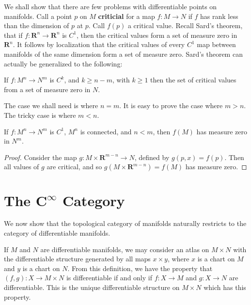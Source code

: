 We shall show that there are few problems with differentiable points on manifolds. Call a point $p$ on $M$ {\bf criticial} for a map $f:M \to N$ if $f$ has rank less than the dimension of $p$ at $p$. Call $f(p)$ a critical value. Recall Sard's theorem, that if $f: \mathbf{R}^n \to \mathbf{R}^n$ is $C^1$, then the critical values form a set of measure zero in $\mathbf{R}^n$. It follows by localization that the critical values of every $C^1$ map between manifolds of the same dimension form a set of measure zero. Sard's theorem can actually be generalized to the following:

\begin{theorem}[Sard]
    If $f:M^n \to N^m$ is $C^k$, and $k \geq n-m$, with $k \geq 1$ then the set of critical values from a set of measure zero in $N$.
\end{theorem}

The case we shall need is where $n = m$. It is easy to prove the case where $m > n$. The tricky case is where $m < n$.

\begin{theorem}
    If $f:M^n \to N^m$ is $C^1$, $M^n$ is connected, and $n < m$, then $f(M)$ has measure zero in $N^m$.
\end{theorem}
\begin{proof}
    Consider the map $g: M \times \mathbf{R}^{m-n} \to N$, defined by $g(p,x) = f(p)$. Then all values of $g$ are critical, and so $g(M \times \mathbf{R}^{m-n}) = f(M)$ has measure zero.
\end{proof}




\section{The $\mathbf{C^\infty}$ Category}

We now show that the topological category of manifolds naturally restricts to the category of differentiable manifolds.

\begin{example}
    If $M$ and $N$ are differentiable manifolds, we may consider an atlas on $M \times N$ with the differentiable structure generated by all maps $x \times y$, where $x$ is a chart on $M$ and $y$ is a chart on $N$. From this definition, we have the property that $(f,g): X \to M \times N$ is differentiable if and only if $f: X \to M$ and $g: X \to N$ are differentiable. This is the unique differentiable structure on $M \times N$ which has this property.
\end{example}

